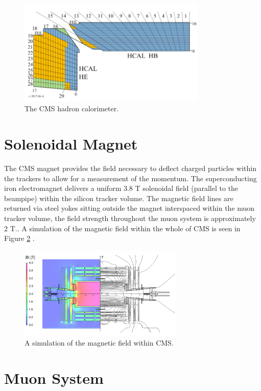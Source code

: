 \begin{figure}[hb!]
\centering
\includegraphics[width=0.8\textwidth]{figs/hcal.png}
\caption{The CMS hadron calorimeter.}
\label{fig:hcal}
\end{figure}

\section{Solenoidal Magnet}

The CMS magnet provides the field necessary to deflect charged particles within the trackers to allow for a measurement of the momentum. The superconducting iron electromagnet delivers a uniform 3.8 T solenoidal field (parallel to the beampipe) within the silicon tracker volume. The magnetic field lines are returned via steel yokes sitting outside the magnet interspaced within the muon tracker volume, the field strength throughout the muon system is approximately 2 T.\cite{magnettdr}. A simulation of the magnetic field within the whole of CMS is seen in Figure \ref{fig:magnet} \cite{magnet}.

\begin{figure}[hb!]
\centering
\includegraphics[width=0.7\textwidth]{figs/magnet.png}
\caption{A simulation of the magnetic field within CMS.}
\label{fig:magnet}
\end{figure}

\section{Muon System}

